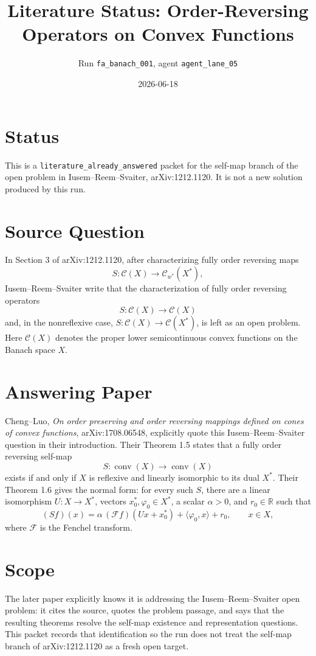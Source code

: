 \documentclass[11pt]{article}
\title{Literature Status: Order-Reversing Operators on Convex Functions}
\author{Run \texttt{fa\_banach\_001}, agent \texttt{agent\_lane\_05}}
\date{2026-06-18}
\newcommand{\C}{\mathscr C}
\newcommand{\conv}{\operatorname{conv}}
\begin{document}
\maketitle

\section*{Status}

This is a \texttt{literature\_already\_answered} packet for the self-map branch
of the open problem in Iusem--Reem--Svaiter, arXiv:1212.1120. It is not a new
solution produced by this run.

\section*{Source Question}

In Section 3 of arXiv:1212.1120, after characterizing fully order reversing
maps
\[
  S:\C(X)\to \C_{w^*}(X^*),
\]
Iusem--Reem--Svaiter write that the characterization of fully order reversing
operators
\[
  S:\C(X)\to\C(X)
\]
and, in the nonreflexive case, \(S:\C(X)\to\C(X^*)\), is left as an open
problem. Here \(\C(X)\) denotes the proper lower semicontinuous convex
functions on the Banach space \(X\).

\section*{Answering Paper}

Cheng--Luo, \emph{On order preserving and order reversing mappings defined on
cones of convex functions}, arXiv:1708.06548, explicitly quote this
Iusem--Reem--Svaiter question in their introduction. Their Theorem 1.5 states
that a fully order reversing self-map
\[
  S:\conv(X)\to\conv(X)
\]
exists if and only if \(X\) is reflexive and linearly isomorphic to its dual
\(X^*\). Their Theorem 1.6 gives the normal form: for every such \(S\), there
are a linear isomorphism \(U:X\to X^*\), vectors
\(x_0^*,\varphi_0\in X^*\), a scalar \(\alpha>0\), and \(r_0\in\mathbb R\)
such that
\[
  (Sf)(x)=\alpha\,(\mathcal F f)(Ux+x_0^*)+\langle\varphi_0,x\rangle+r_0,
  \qquad x\in X,
\]
where \(\mathcal F\) is the Fenchel transform.

\section*{Scope}

The later paper explicitly knows it is addressing the Iusem--Reem--Svaiter
open problem: it cites the source, quotes the problem passage, and says that
the resulting theorems resolve the self-map existence and representation
questions. This packet records that identification so the run does not treat
the self-map branch of arXiv:1212.1120 as a fresh open target.
\end{document}

